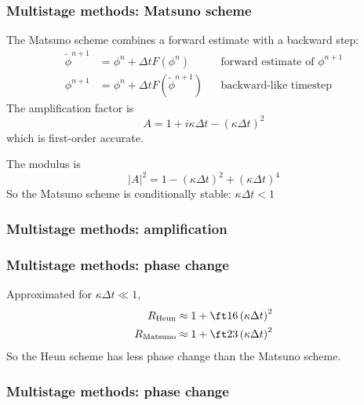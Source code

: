 \documentclass[aspectratio=149,9pt]{beamer}
\begin{document}
%
%
\begin{frame}
	\frametitle{Multistage methods: Matsuno scheme}
	The Matsuno scheme combines a forward estimate with a backward step:
	\begin{align*}
		\tilde \phi^{n+1}&=\phi^n+\Delta t F(\phi^n)	&& \text{forward estimate of }\phi^{n+1}	\\
		\phi^{n+1}&=\phi^n+\Delta t F(\tilde \phi^{n+1}) &&\text{backward-like timestep}
	\end{align*}
	The amplification factor is
	\begin{equation*}
		A=1+i\kappa\Delta t-(\kappa\Delta t)^2
	\end{equation*}
	which is first-order accurate.
	\par\vspace*{2ex}
	The modulus is
	\begin{equation*}
		|A|^2=1 - \left(\kappa \Delta t \right)^2+ \left(\kappa \Delta t \right)^4
	\end{equation*}
	So the Matsuno scheme is conditionally stable: $\kappa\Delta t<1$
\end{frame}
%
%
%
\begin{frame}
	\frametitle{Multistage methods: amplification}
%
\footnotesize
%
\begin{center}
	\scalebox{.95}{}
\end{center}
%
\end{frame}
%
%
%
\begin{frame}
	\frametitle{Multistage methods: phase change}
	Approximated for $\kappa \Delta t\ll 1$,
	\begin{align*}
		R_\text{Heun} &\approx 1 + \ft16 \left(\kappa \Delta t\right)^2 \\
		R_\text{Matsuno} &\approx 1 + \ft23 \left(\kappa \Delta t \right)^2
	\end{align*}
	So the Heun scheme has less phase change than the Matsuno scheme.
\end{frame}
%
%
%
\begin{frame}
	\frametitle{Multistage methods: phase change}
\footnotesize
%
\begin{center}
	\scalebox{.95}{}
\end{center}
%
\end{frame}
\end{document}
